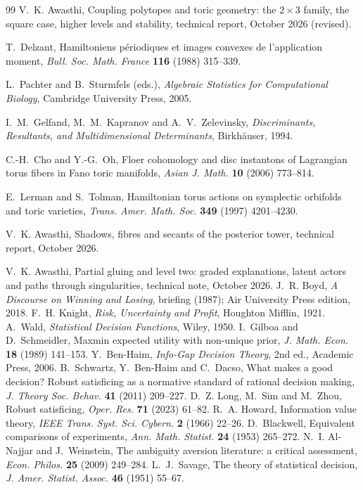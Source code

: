 \documentclass[11pt]{article}
\theoremstyle{definition}\newtheorem{definition}{Definition}\newtheorem{remark}{Remark}
\begin{document}
\begin{thebibliography}{99}\small
{} V.~K. Awasthi, Coupling polytopes and toric geometry: the $2\times3$ family, the square case, higher levels and stability, technical report, October 2026 (revised).

 T.~Delzant, Hamiltoniens périodiques et images convexes de l'application moment, \emph{Bull. Soc. Math. France} \textbf{116} (1988) 315--339.

 L.~Pachter and B.~Sturmfels (eds.), \emph{Algebraic Statistics for Computational Biology}, Cambridge University Press, 2005.

 I.~M.~Gelfand, M.~M.~Kapranov and A.~V.~Zelevinsky, \emph{Discriminants, Resultants, and Multidimensional Determinants}, Birkhäuser, 1994.

 C.-H.~Cho and Y.-G.~Oh, Floer cohomology and disc instantons of Lagrangian torus fibers in Fano toric manifolds, \emph{Asian J. Math.} \textbf{10} (2006) 773--814.

 E.~Lerman and S.~Tolman, Hamiltonian torus actions on symplectic orbifolds and toric varieties, \emph{Trans. Amer. Math. Soc.} \textbf{349} (1997) 4201--4230.

 V.~K. Awasthi, Shadows, fibres and secants of the posterior tower, technical report, October 2026.

 V.~K. Awasthi, Partial gluing and level two: graded explanations, latent actors and paths through singularities, technical note, October 2026.
 J.~R. Boyd, \emph{A Discourse on Winning and Losing}, briefing (1987); Air University Press edition, 2018.
 F.~H. Knight, \emph{Risk, Uncertainty and Profit}, Houghton Mifflin, 1921.
 A.~Wald, \emph{Statistical Decision Functions}, Wiley, 1950.
 I.~Gilboa and D.~Schmeidler, Maxmin expected utility with non-unique prior, \emph{J. Math. Econ.} \textbf{18} (1989) 141--153.
 Y.~Ben-Haim, \emph{Info-Gap Decision Theory}, 2nd ed., Academic Press, 2006.
 B.~Schwartz, Y.~Ben-Haim and C.~Dacso, What makes a good decision? Robust satisficing as a normative standard of rational decision making, \emph{J. Theory Soc. Behav.} \textbf{41} (2011) 209--227.
 D.~Z. Long, M.~Sim and M.~Zhou, Robust satisficing, \emph{Oper. Res.} \textbf{71} (2023) 61--82.
 R.~A. Howard, Information value theory, \emph{IEEE Trans. Syst. Sci. Cybern.} \textbf{2} (1966) 22--26.
 D.~Blackwell, Equivalent comparisons of experiments, \emph{Ann. Math. Statist.} \textbf{24} (1953) 265--272.
 N.~I. Al-Najjar and J.~Weinstein, The ambiguity aversion literature: a critical assessment, \emph{Econ. Philos.} \textbf{25} (2009) 249--284.
 L.~J.~Savage, The theory of statistical decision, \emph{J. Amer. Statist. Assoc.} \textbf{46} (1951) 55--67.


\end{thebibliography}
\end{document}
